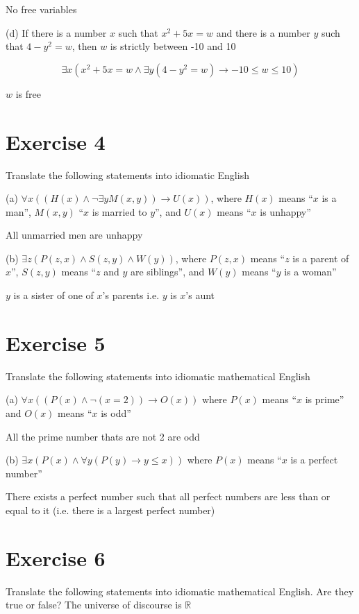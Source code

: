 \documentclass[11pt]{article}
\newcommand{\then}{\rightarrow}
\begin{document}
No free variables

\noindent (d) If there is a number $x$ such that $x^2 + 5x = w$ and there is a 
number $y$ such that $4 - y^2 = w$, then $w$ is strictly between -10 and 10

$$\exists x (x^2 + 5x = w \wedge \exists y (4 - y^2 = w) \then -10 \leq w \leq 10)$$

$w$ is free

\section*{Exercise 4}

\noindent Translate the following statements into idiomatic English

\noindent (a) $\forall x ((H(x) \wedge \neg \exists y M(x, y)) \then U(x))$, 
where $H(x)$ means ``$x$ is a man'', $M(x, y)$ ``$x$ is married to $y$'',
and $U(x)$ means ``$x$ is unhappy''

All unmarried men are unhappy

\noindent (b) $\exists z (P(z, x) \wedge S(z, y) \wedge W(y))$, where $P(z, x)$ 
means ``$z$ is a parent of $x$'', $S(z, y)$ means ``$z$ and $y$ are siblings'',
and $W(y)$ means ``$y$ is a woman''

$y$ is a sister of one of $x$'s parents i.e. $y$ is $x$'s aunt

\section*{Exercise 5}

\noindent Translate the following statements into idiomatic mathematical 
English

\noindent (a) $\forall x ((P(x) \wedge \neg (x = 2)) \then O(x))$ where $P(x)$ 
means ``$x$ is prime'' and $O(x)$ means ``$x$ is odd''

All the prime number thats are not 2 are odd

\noindent (b) $\exists x (P(x) \wedge \forall y (P(y) \then y \leq x))$ where 
$P(x)$ means ``$x$ is a perfect number''

There exists a perfect number such that all perfect numbers are less than or 
equal to it (i.e. there is a largest perfect number)

\section*{Exercise 6}

\noindent Translate the following statements into idiomatic mathematical 
English. Are they true or false? The universe of discourse is $\mathbb{R}$
\end{document}
